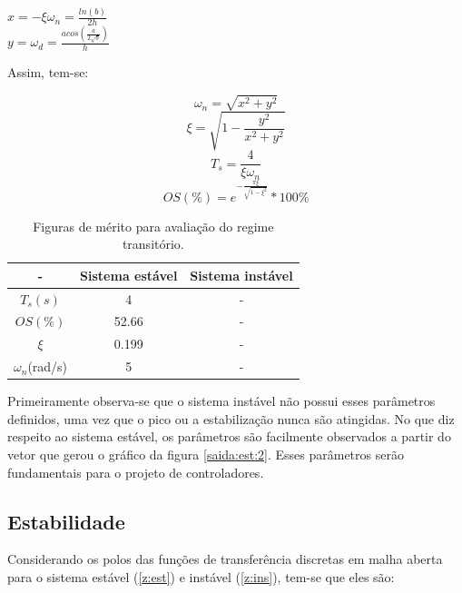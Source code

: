 \begin{center}
    $x = -\xi \omega_n = \frac{ln(b)}{2h}$\vspace{4pt}\\
    $y = \omega_d = \frac{acos(\frac{a}{2\sqrt{b}})}{h}$ \vspace{4pt}
\end{center}

Assim, tem-se:

\begin{equation} \label{tran:3}
    \omega_n = \sqrt{x^2+y^2}
\end{equation}
\begin{equation} \label{tran:4}
    \xi = \sqrt{1 - \frac{y^2}{x^2+y^2}}
\end{equation}
\begin{equation} \label{tran:6}
    T_s = \frac{4}{\xi \omega_n}
\end{equation}
\begin{equation} \label{tran:7}
    OS(\%) = e^{-\frac{\pi \xi}{\sqrt{1- \xi^2}}} * 100\%
\end{equation}

\begin{table}[h]
\centering
\caption{Figuras de mérito para avaliação do regime transitório.}\label{table:2}
\begin{tabular}{c|cc}

 - & Sistema estável & Sistema instável \\ \hline
$T_s(s)$ & 4 & -\\
$OS(\%)$ & 52.66 & -  \\ 
$\xi$ & 0.199 & - \\
$\omega_n$(rad/s) & 5 & - \\ \hline
\end{tabular}
\end{table}

Primeiramente observa-se que o sistema instável não possui esses parâmetros definidos, uma vez que o pico ou a estabilização nunca são atingidas. No que diz respeito ao sistema estável, os parâmetros são facilmente observados a partir do vetor que gerou o gráfico da figura \ref{saida:est:2}. Esses parâmetros serão fundamentais para o projeto de controladores.

\subsection{Estabilidade}

Considerando os polos das funções de transferência discretas em malha aberta para o sistema estável (\ref{z:est}) e instável (\ref{z:ins}), tem-se que eles são:

